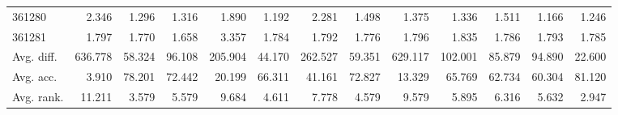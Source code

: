 \begin{tabular}{lrrrrrrrrrrrr}
361280 & 2.346 & 1.296 & 1.316 & 1.890 & 1.192 & 2.281 & 1.498 & 1.375 & 1.336 & 1.511 & 1.166 & 1.246 \\
361281 & 1.797 & 1.770 & 1.658 & 3.357 & 1.784 & 1.792 & 1.776 & 1.796 & 1.835 & 1.786 & 1.793 & 1.785 \\
Avg. diff. & 636.778 & 58.324 & 96.108 & 205.904 & 44.170 & 262.527 & 59.351 & 629.117 & 102.001 & 85.879 & 94.890 & 22.600 \\
Avg. acc. & 3.910 & 78.201 & 72.442 & 20.199 & 66.311 & 41.161 & 72.827 & 13.329 & 65.769 & 62.734 & 60.304 & 81.120 \\
Avg. rank. & 11.211 & 3.579 & 5.579 & 9.684 & 4.611 & 7.778 & 4.579 & 9.579 & 5.895 & 6.316 & 5.632 & 2.947 \\
\bottomrule
\end{tabular}
